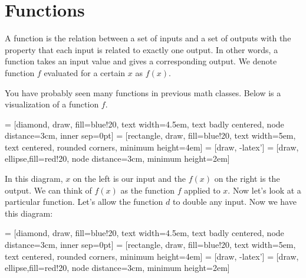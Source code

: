 \chapter{Functions}

\begin{defn}[Function]
A function is the relation between a set of inputs and a set of outputs with the property that each input is related to exactly one output. In other words, a function takes  an input value and gives a corresponding output. We denote function $f$ evaluated for a certain $x$ as $f(x)$.
\end{defn}

You have probably seen many functions in previous math classes. Below is a visualization of a function $f$.



\begin{center}
 = [diamond, draw, fill=blue!20, 
    text width=4.5em, text badly centered, node distance=3cm, inner sep=0pt]
 = [rectangle, draw, fill=blue!20, 
    text width=5em, text centered, rounded corners, minimum height=4em]
 = [draw, -latex']
 = [draw, ellipse,fill=red!20, node distance=3cm,
    minimum height=2em]
    
\end{center}

In this diagram, $x$ on the left is our input and the $f(x)$ on the right is the output. We can think of $f(x)$ as the function $f$ applied to $x$. Now let's look at a particular function. Let's allow the function $d$ to double any input. Now we have this diagram:

\begin{center}
 = [diamond, draw, fill=blue!20, 
    text width=4.5em, text badly centered, node distance=3cm, inner sep=0pt]
 = [rectangle, draw, fill=blue!20, 
    text width=5em, text centered, rounded corners, minimum height=4em]
 = [draw, -latex']
 = [draw, ellipse,fill=red!20, node distance=3cm,
    minimum height=2em]

\end{center}

